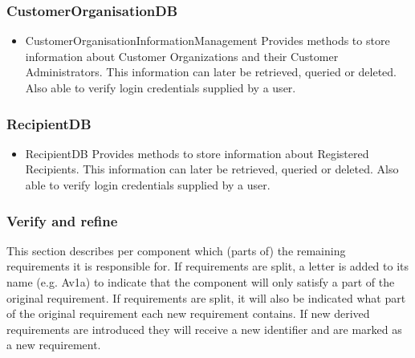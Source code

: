 \documentclass[a4paper,10pt]{article}
\begin{document}
\subsubsection*{CustomerOrganisationDB}
\begin{itemize}
	\item CustomerOrganisationInformationManagement
	Provides methods to store information about Customer Organizations and their Customer Administrators. This information can later be retrieved, queried or deleted. Also able to verify login credentials supplied by a user.
\end{itemize}

\subsubsection*{RecipientDB}
\begin{itemize}
	\item RecipientDB
	Provides methods to store information about Registered Recipients. This information can later be retrieved, queried or deleted. Also able to verify login credentials supplied by a user.
\end{itemize}

\subsubsection{Verify and refine}
This section describes per component which (parts of) the remaining requirements it is responsible for. If requirements are split, a letter is added to its name (e.g. Av1a) to indicate that the component will only satisfy a part of the original requirement. If requirements are split, it will also be indicated what part of the original requirement each new requirement contains. If new derived requirements are introduced they will receive a new identifier and are marked as a new requirement.
\end{document}
